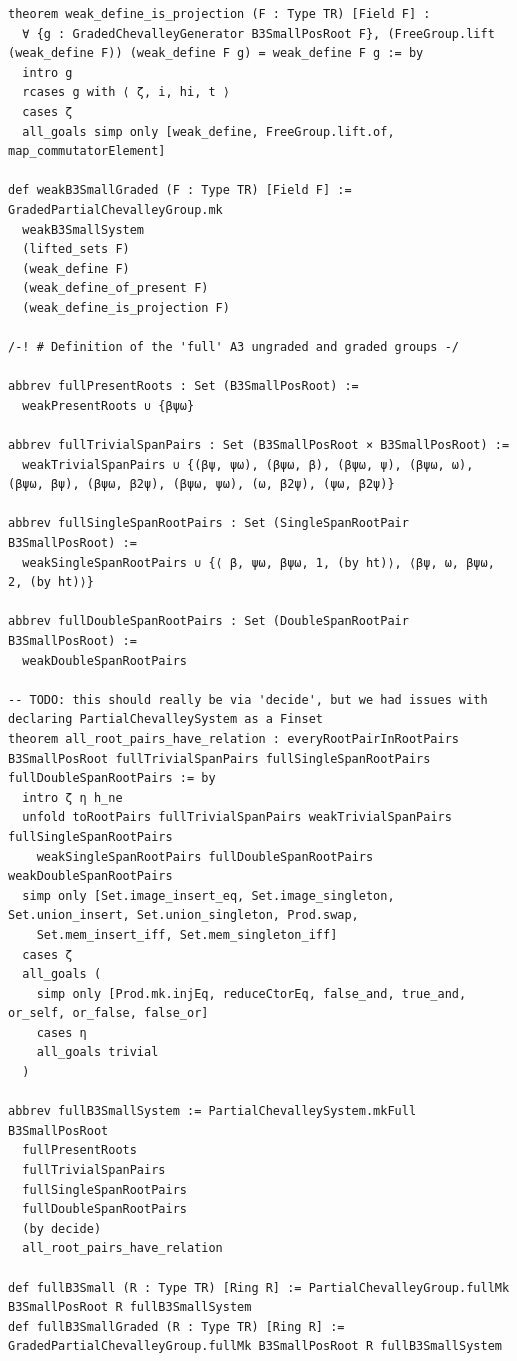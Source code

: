 \begin{Verbatim}
theorem weak_define_is_projection (F : Type TR) [Field F] :
  ∀ {g : GradedChevalleyGenerator B3SmallPosRoot F}, (FreeGroup.lift (weak_define F)) (weak_define F g) = weak_define F g := by
  intro g
  rcases g with ⟨ ζ, i, hi, t ⟩
  cases ζ
  all_goals simp only [weak_define, FreeGroup.lift.of, map_commutatorElement]

def weakB3SmallGraded (F : Type TR) [Field F] := GradedPartialChevalleyGroup.mk
  weakB3SmallSystem
  (lifted_sets F)
  (weak_define F)
  (weak_define_of_present F)
  (weak_define_is_projection F)

/-! # Definition of the 'full' A3 ungraded and graded groups -/

abbrev fullPresentRoots : Set (B3SmallPosRoot) :=
  weakPresentRoots ∪ {βψω}

abbrev fullTrivialSpanPairs : Set (B3SmallPosRoot × B3SmallPosRoot) :=
  weakTrivialSpanPairs ∪ {(βψ, ψω), (βψω, β), (βψω, ψ), (βψω, ω), (βψω, βψ), (βψω, β2ψ), (βψω, ψω), (ω, β2ψ), (ψω, β2ψ)}

abbrev fullSingleSpanRootPairs : Set (SingleSpanRootPair B3SmallPosRoot) :=
  weakSingleSpanRootPairs ∪ {⟨ β, ψω, βψω, 1, (by ht)⟩, ⟨βψ, ω, βψω, 2, (by ht)⟩}

abbrev fullDoubleSpanRootPairs : Set (DoubleSpanRootPair B3SmallPosRoot) :=
  weakDoubleSpanRootPairs

-- TODO: this should really be via 'decide', but we had issues with declaring PartialChevalleySystem as a Finset
theorem all_root_pairs_have_relation : everyRootPairInRootPairs B3SmallPosRoot fullTrivialSpanPairs fullSingleSpanRootPairs fullDoubleSpanRootPairs := by
  intro ζ η h_ne
  unfold toRootPairs fullTrivialSpanPairs weakTrivialSpanPairs fullSingleSpanRootPairs
    weakSingleSpanRootPairs fullDoubleSpanRootPairs weakDoubleSpanRootPairs
  simp only [Set.image_insert_eq, Set.image_singleton, Set.union_insert, Set.union_singleton, Prod.swap,
    Set.mem_insert_iff, Set.mem_singleton_iff]
  cases ζ
  all_goals (
    simp only [Prod.mk.injEq, reduceCtorEq, false_and, true_and, or_self, or_false, false_or]
    cases η
    all_goals trivial
  )

abbrev fullB3SmallSystem := PartialChevalleySystem.mkFull B3SmallPosRoot
  fullPresentRoots
  fullTrivialSpanPairs
  fullSingleSpanRootPairs
  fullDoubleSpanRootPairs
  (by decide)
  all_root_pairs_have_relation

def fullB3Small (R : Type TR) [Ring R] := PartialChevalleyGroup.fullMk B3SmallPosRoot R fullB3SmallSystem
def fullB3SmallGraded (R : Type TR) [Ring R] := GradedPartialChevalleyGroup.fullMk B3SmallPosRoot R fullB3SmallSystem


\end{Verbatim}
